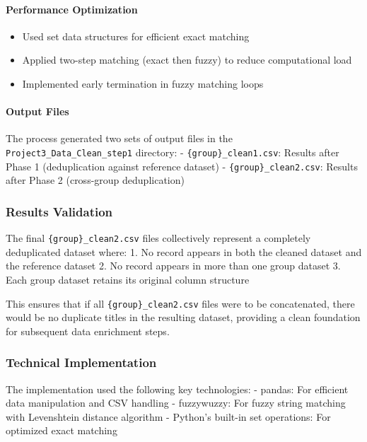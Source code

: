 \documentclass[12pt]{article}
\providecommand{\tightlist}{%
  \setlength{\itemsep}{0pt}\setlength{\parskip}{0pt}}
\begin{document}
\paragraph{Performance
Optimization}\label{performance-optimization}

\begin{itemize}
\tightlist
\item
  Used set data structures for efficient exact matching
\item
  Applied two-step matching (exact then fuzzy) to reduce computational
  load
\item
  Implemented early termination in fuzzy matching loops
\end{itemize}

\paragraph{Output Files}\label{output-files}

The process generated two sets of output files in the
\texttt{Project3\_Data\_Clean\_step1} directory: -
\texttt{\{group\}\_clean1.csv}: Results after Phase 1 (deduplication
against reference dataset) - \texttt{\{group\}\_clean2.csv}: Results
after Phase 2 (cross-group deduplication)

\subsubsection{Results Validation}\label{results-validation}

The final \texttt{\{group\}\_clean2.csv} files collectively represent a
completely deduplicated dataset where: 1. No record appears in both the
cleaned dataset and the reference dataset 2. No record appears in more
than one group dataset 3. Each group dataset retains its original column
structure

This ensures that if all \texttt{\{group\}\_clean2.csv} files were to be
concatenated, there would be no duplicate titles in the resulting
dataset, providing a clean foundation for subsequent data enrichment
steps.

\subsubsection{Technical
Implementation}\label{technical-implementation}

The implementation used the following key technologies: - pandas: For
efficient data manipulation and CSV handling - fuzzywuzzy: For fuzzy
string matching with Levenshtein distance algorithm - Python's built-in
set operations: For optimized exact matching
\end{document}
